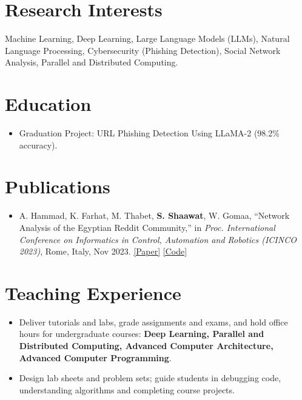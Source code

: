 
\def\orcid{}


\section{Research Interests}
Machine Learning, Deep Learning, Large Language Models (LLMs), Natural Language Processing, Cybersecurity (Phishing Detection), Social Network Analysis, Parallel and Distributed Computing.

\section{Education}
\begin{itemize}
  \item Graduation Project: URL Phishing Detection Using LLaMA-2 (98.2\% accuracy).
\end{itemize}

\section{Publications}
\begin{itemize}
  \item A. Hammad, K. Farhat, M. Thabet, \textbf{S. Shaawat}, W. Gomaa, ``Network Analysis of the Egyptian Reddit Community,'' in \textit{Proc. International Conference on Informatics in Control, Automation and Robotics (ICINCO 2023)}, Rome, Italy, Nov 2023. \href{https://tinyurl.com/4fyhhbvy}{[Paper]} \href{https://github.com/SamyShaawat/Network-Analysis-of-the-Egyptian-Reddit-Community}{[Code]}
\end{itemize}

\section{Teaching Experience}
\begin{itemize}
  \item Deliver tutorials and labs, grade assignments and exams, and hold office hours for undergraduate courses: \textbf{Deep Learning, Parallel and Distributed Computing, Advanced Computer Architecture, Advanced Computer Programming}.
  \item Design lab sheets and problem sets; guide students in debugging code, understanding algorithms and completing course projects.
\end{itemize}

